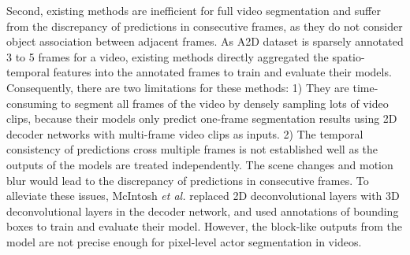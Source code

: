 \documentclass[journal]{IEEEtran}
\begin{document}
Second, existing methods are inefficient for full video segmentation and suffer from the discrepancy of predictions in consecutive frames, as they do not consider object association between adjacent frames. As A2D dataset \cite{xu2015can} is sparsely annotated 3 to 5 frames for a video, existing methods \cite{gavrilyuk2018actor,wang2019asymmetric,wang2020context} directly aggregated the spatio-temporal features into the annotated frames to train and evaluate their models. Consequently, there are two limitations for these methods: 1) They are time-consuming to segment all frames of the video by densely sampling lots of video clips, because their models only predict one-frame segmentation results using 2D decoder networks with multi-frame video clips as inputs. 2) The temporal consistency of predictions cross multiple frames is not established well as the outputs of the models are treated independently. The scene changes and motion blur would lead to the discrepancy of predictions in consecutive frames. To alleviate these issues, McIntosh \emph{et al.} \cite{mcintosh2018multi} replaced 2D deconvolutional layers with 3D deconvolutional layers in the decoder network, and used annotations of bounding boxes to train and evaluate their model. However, the block-like outputs from the model are not precise enough for pixel-level actor segmentation in videos.
\end{document}
